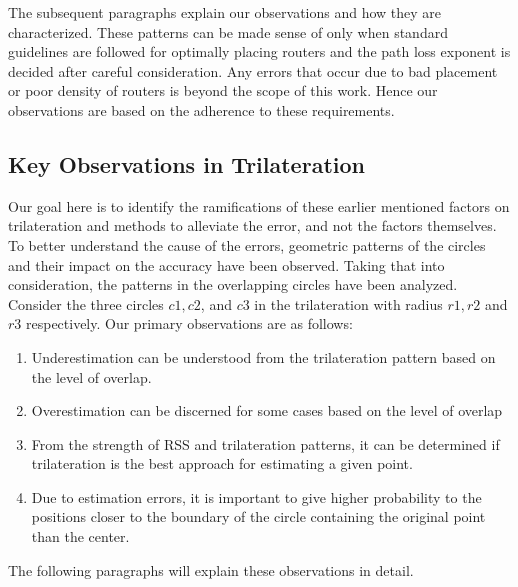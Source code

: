 \documentclass[twocolumn]{svjour3}
\begin{document}
The subsequent paragraphs explain our observations and how they are characterized. These patterns can be made sense of only when standard guidelines are followed for optimally placing routers and the path loss exponent is decided after careful consideration. Any errors that occur due to bad placement or poor density of routers is beyond the scope of this work. Hence our observations are based on the adherence to these requirements. 

\subsection {\textbf{Key Observations in Trilateration}}
Our goal here is to identify the ramifications of these earlier mentioned factors on trilateration and methods to alleviate the error, and not the factors themselves. To better understand the cause of the errors, geometric patterns of the circles and their impact on the accuracy have been observed. Taking that into consideration, the patterns in the overlapping circles have been analyzed. Consider the three circles $c1, c2$, and $c3$ in the trilateration with radius $r1, r2$ and $r3$ respectively. Our primary observations are as follows:
\begin{enumerate}
    \item Underestimation can be understood from the trilateration pattern based on the level of overlap. 
    \item  Overestimation can be discerned for some cases based on the level of overlap
    \item From the strength of RSS and trilateration patterns, it can be determined if trilateration is the best approach for estimating a given point. 
     \item Due to estimation errors, it is important to give higher probability to the positions closer to the boundary of the circle containing the original point than the center.
\end{enumerate}
The following paragraphs will explain these observations in detail. 
\end{document}
